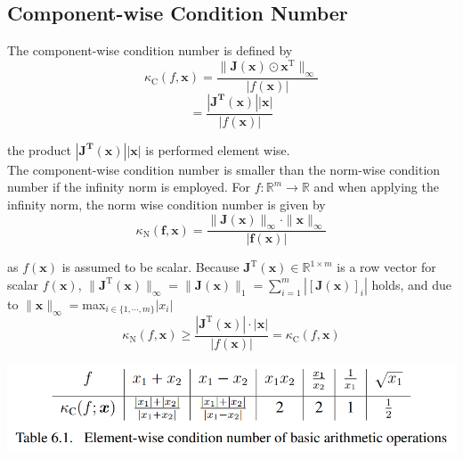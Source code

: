 \documentclass[english]{latex4ei/latex4ei_sheet}
\begin{document}
\begin{sectionbox}
    \subsection{Component-wise Condition Number}
    The component-wise condition number is defined by
    $$\kappa_\text{C}(f,\mathbf{x}) = \frac{\parallel\mathbf{J}(\mathbf{x})\odot\mathbf{x}^\text{T}\parallel_\infty}{|f(\mathbf{x})|}$$
    $$=\frac{|\mathbf{J^\text{T}(\mathbf{x})}||\mathbf{x}| }{|f(\mathbf{x})| }$$

    the product $|\mathbf{J^\text{T}(\mathbf{x})}||\mathbf{x}|$ is performed  element wise.\\

    The component-wise condition number is smaller than the norm-wise condition number if the infinity norm is employed. For $f:\mathbb{R}^m \to \mathbb{R}$ and when applying the infinity norm, the norm wise condition number is given by
    $$\kappa_\text{N}(\mathbf{f}, \mathbf{x}) = \frac{\parallel \mathbf{J}(\mathbf{x})\parallel_\infty \cdot \parallel \mathbf{x} \parallel_\infty}{| \mathbf{f}(\mathbf{x})|}$$

    as $f(\mathbf{x})$ is assumed to be scalar. Because $\mathbf{J}^\text{T}(\mathbf{x})\in\mathbb{R}^{1\times m}$ is a row vector for scalar $f(\mathbf{x})$, $\parallel\mathbf{J}^\text{T}(\mathbf{x})\parallel_\infty = \parallel \mathbf{J}(\mathbf{x})\parallel_1 = \sum_{i=1}^{m} \left|[\mathbf{J}(\mathbf{x})]_i\right|$ holds, and due to $\parallel \mathbf{x}\parallel_\infty = $max$_{i\in\{1,\cdots,m\}}|x_i|$\\

    $$\kappa_\text{N}(f,\mathbf{x}) \geq \frac{|\mathbf{J}^\text{T}(\mathbf{x})|\cdot |\mathbf{x}|}{\left|f(\mathbf{x})\right|}=\kappa_\text{C}(f,\mathbf{x})$$

\end{sectionbox}
\begin{sectionbox}
    \includegraphics[width=\textwidth]{img/kc_operations.png}
\end{sectionbox}
\end{document}

